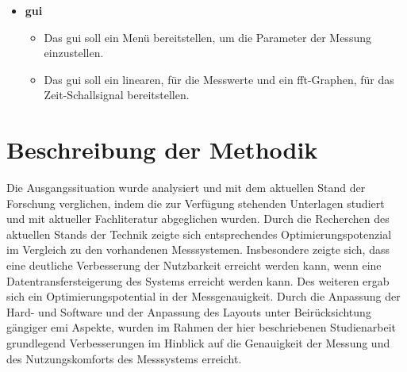 \begin{itemize}\itemsep0pt
	\item \textbf{\ac{gui}}
	\begin{itemize}\itemsep0pt
		\item Das \ac{gui} soll ein Menü bereitstellen, um die Parameter der Messung einzustellen.
		\item Das \ac{gui} soll ein linearen, für die Messwerte und ein \ac{fft}-Graphen, für das Zeit-Schallsignal bereitstellen.
	\end{itemize}
\end{itemize}
%
%
%
\section{Beschreibung der Methodik}
Die Ausgangssituation wurde analysiert und mit dem aktuellen Stand der Forschung verglichen, indem die zur Verfügung stehenden Unterlagen studiert und mit aktueller Fachliteratur abgeglichen wurden. Durch die Recherchen des aktuellen Stands der Technik zeigte sich entsprechendes Optimierungspotenzial im Vergleich zu den vorhandenen Messsystemen. Insbesondere zeigte sich, dass eine deutliche Verbesserung der Nutzbarkeit erreicht werden kann, wenn eine Datentransfersteigerung des Systems erreicht werden kann. Des weiteren ergab sich ein Optimierungspotential in der Messgenauigkeit. Durch die Anpassung der Hard- und Software und der Anpassung des Layouts unter Beirücksichtung gängiger \ac{emi} Aspekte, wurden im Rahmen der hier beschriebenen Studienarbeit grundlegend Verbesserungen im Hinblick auf die Genauigkeit der Messung und des Nutzungskomforts des Messsystems erreicht.